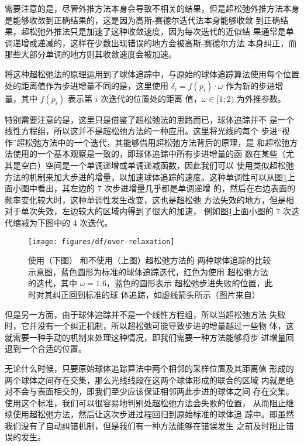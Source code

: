 需要注意的是，尽管外推方法本身会导致不相关的结果，但是超松弛外推方法本身是能够收敛到正确结果的，这是因为高斯-赛德尔迭代法本身能够收敛 到正确结果，超松弛外推法只是加速了这种收敛速度，因为每次迭代的近似结 果通常是单调递增或递减的，这样在少数出现错误的地方会被高斯-赛德尔方法 本身纠正，而那些大部分单调的地方则其收敛速度会被加速。

\cite{a:Enhanced-Sphere-Tracing}将这种超松弛法的原理运用到了球体追踪中，与原始的球体追踪算法使用每个位置处的距离值作为步进增量不同的是，这里使用 $\delta_i = f(p_i) \cdot \omega$ 作为新的步进增量，其中 $f(p_i)$ 表示第 $i$ 次迭代的位置处的距离 值，$\omega \in [1; 2)$ 为外推参数。

特别需要注意的是，这里只是借鉴了超松弛法的思路而已，球体追踪并不 是一个线性方程组，所以这并不是超松弛方法的一种应用。这里将光线的每个 步进“视作”超松弛方法中的一个迭代，其能够借用超松弛方法背后的原理，是 和超松弛方法使用的一个基本观察是一致的，即球体追踪中所有步进增量的函 数在某些（尤其是空白）空间是一个单调递增或单调递减函数，因此我们可以 使用类似超松弛方法的机制来加大步进的增量，以加速球体追踪的速度。这种单调性可以从图\ref{f:df-over-relaxation}上面小图中看出，其左边的 7 次步进增量几乎都是单调递增 的，然后在右边表面的频率变化较大时，这种单调性发生改变，这也是超松弛 方法失效的地方，但是相对于单次失效，左边较大的区域内得到了很大的加速， 例如图\ref{f:df-over-relaxation}上面小图的 7 次迭代缩减为下图中的 4 次迭代。

\begin{figure}
\sidecaption
	\texttt{[image: figures/df/over-relaxation]}
	\caption{使用（下图） 和不使用（上图）超松弛方法的 两种球体追踪的比较示意图，蓝色圆形为标准的球体追踪迭代，红色为使用 超松弛方法的迭代，其中 $\omega = 1.6$，蓝色的圆形表示 超松弛步进失败的位置，此时对其纠正回到标准的球 体追踪，如虚线箭头所示（图片来自\cite{a:Enhanced-Sphere-Tracing}）}
	\label{f:df-over-relaxation}
\end{figure}

但是另一方面，由于球体追踪并不是一个线性方程组，所以当超松弛方法 失败时，它并没有一个纠正机制，所以超松弛可能导致步进的增量越过一些物 体，这就需要一种手动的机制来处理这种情况，即我们需要一种方法能够将步 进增量回退到一个合适的位置。

无论什么时候，只要原始球体追踪算法中两个相邻的采样位置及其距离值 形成的两个球体之间存在交集，那么光线线段在这两个球体形成的联合的区域 内就是绝对不会与表面相交的，即我们至少应该保证相邻两此步进的球体之间 存在交集。使用这个标准，我们可以很容易地判别处超松弛方法会失败的位置， 从而阻止继续使用超松弛方法，然后让这次步进过程回归到原始标准的球体追 踪中。即虽然我们没有了自动纠错机制，但是我们有一种方法能够在错误发生 之前及时阻止错误的发生。

